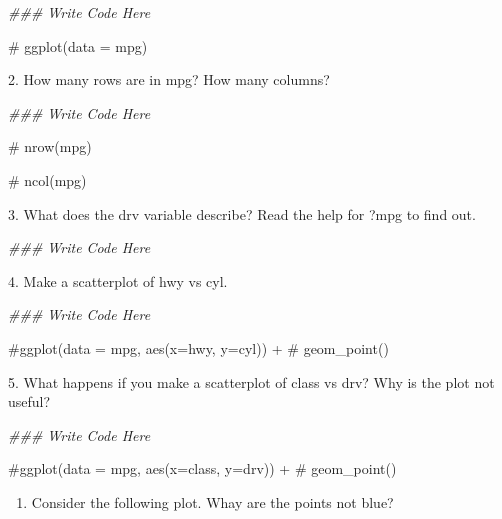 \documentclass[
  letterpaper,
  DIV=11,
  numbers=noendperiod]{scrreprt}
\newenvironment{Shaded}{\begin{snugshade}}{\end{snugshade}}
\newcommand{\CommentTok}[1]{\textcolor[rgb]{0.37,0.37,0.37}{#1}}
\newcommand{\DocumentationTok}[1]{\textcolor[rgb]{0.37,0.37,0.37}{\textit{#1}}}
\providecommand{\tightlist}{%
  \setlength{\itemsep}{0pt}\setlength{\parskip}{0pt}}\usepackage{longtable,booktabs,array}
\begin{document}
\begin{Shaded}
\begin{Highlighting}[]
\DocumentationTok{\#\#\# Write Code Here}

\CommentTok{\# ggplot(data = mpg)}
\end{Highlighting}
\end{Shaded}

2. How many rows are in mpg? How many columns?

\begin{Shaded}
\begin{Highlighting}[]
\DocumentationTok{\#\#\# Write Code Here}

\CommentTok{\# nrow(mpg)}

\CommentTok{\# ncol(mpg)}
\end{Highlighting}
\end{Shaded}

3. What does the drv variable describe? Read the help for ?mpg to find
out.

\begin{Shaded}
\begin{Highlighting}[]
\DocumentationTok{\#\#\# Write Code Here}
\end{Highlighting}
\end{Shaded}

4. Make a scatterplot of hwy vs cyl.

\begin{Shaded}
\begin{Highlighting}[]
\DocumentationTok{\#\#\# Write Code Here}

\CommentTok{\#ggplot(data = mpg, aes(x=hwy, y=cyl)) +}
\CommentTok{\#  geom\_point()}
\end{Highlighting}
\end{Shaded}

5. What happens if you make a scatterplot of class vs drv? Why is the
plot not useful?

\begin{Shaded}
\begin{Highlighting}[]
\DocumentationTok{\#\#\# Write Code Here}

\CommentTok{\#ggplot(data = mpg, aes(x=class, y=drv)) +}
\CommentTok{\#  geom\_point()}
\end{Highlighting}
\end{Shaded}

\begin{enumerate}
\def\labelenumi{\arabic{enumi}.}
\setcounter{enumi}{5}
\tightlist
\item
  Consider the following plot. Whay are the points not blue?
\end{enumerate}
\end{document}
